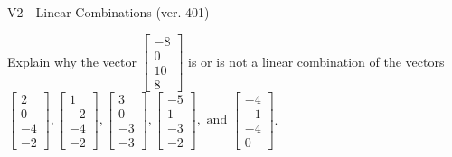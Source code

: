 \begin{exercise}
  \begin{exerciseTitle}V2 - Linear Combinations (ver. 401)\end{exerciseTitle}
  \begin{exerciseStatement}
    Explain why the vector \(\left[\begin{array}{c}
-8 \\
0 \\
10 \\
8
\end{array}\right]\)  is or is not a linear 
	combination of the vectors \(\left[\begin{array}{c}
2 \\
0 \\
-4 \\
-2
\end{array}\right] , \left[\begin{array}{c}
1 \\
-2 \\
-4 \\
-2
\end{array}\right] , \left[\begin{array}{c}
3 \\
0 \\
-3 \\
-3
\end{array}\right] , \left[\begin{array}{c}
-5 \\
1 \\
-3 \\
-2
\end{array}\right] , \text{ and } \left[\begin{array}{c}
-4 \\
-1 \\
-4 \\
0
\end{array}\right]\).
	



\end{exerciseStatement}
\end{exercise}
